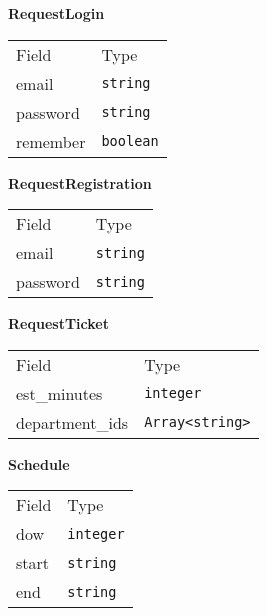     \begin{table}[H]
    \centering
    \textbf{RequestLogin}\\
    \everyrow{\tabucline[0.5pt]-}
    \begin{tabu} to 0.55\textwidth {|X|X|} \hline
    Field & Type \\
    email & \texttt{string} \\
password & \texttt{string} \\
remember & \texttt{boolean} \\
\end{tabu}
\end{table}


    \begin{table}[H]
    \centering
    \textbf{RequestRegistration}\\
    \everyrow{\tabucline[0.5pt]-}
    \begin{tabu} to 0.55\textwidth {|X|X|} \hline
    Field & Type \\
    email & \texttt{string} \\
password & \texttt{string} \\
\end{tabu}
\end{table}


    \begin{table}[H]
    \centering
    \textbf{RequestTicket}\\
    \everyrow{\tabucline[0.5pt]-}
    \begin{tabu} to 0.55\textwidth {|X|X|} \hline
    Field & Type \\
    est\_minutes & \texttt{integer} \\
department\_ids & \texttt{Array<string>} \\
\end{tabu}
\end{table}


    \begin{table}[H]
    \centering
    \textbf{Schedule}\\
    \everyrow{\tabucline[0.5pt]-}
    \begin{tabu} to 0.55\textwidth {|X|X|} \hline
    Field & Type \\
    dow & \texttt{integer} \\
start & \texttt{string} \\
end & \texttt{string} \\
\end{tabu}
\end{table}


